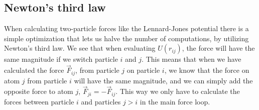 \subsection{Newton's third law}
When calculating two-particle forces like the Lennard-Jones potential there is a simple optimization that lets us halve the number of computations, by utilizing Newton's third law. We see that when evaluating $U(r_{ij})$, the force will have the same magnitude if we switch particle $i$ and $j$. This means that when we have calculated the force $\vec F_{ij}$, from particle $j$ on particle $i$, we know that the force on atom $j$ from particle $i$ will have the same magnitude, and we can simply add the opposite force to atom $j$, $\vec F_{ji} = -\vec F_{ij}$. This way we only have to calculate the forces between particle $i$ and particles $j>i$ in the main force loop.

